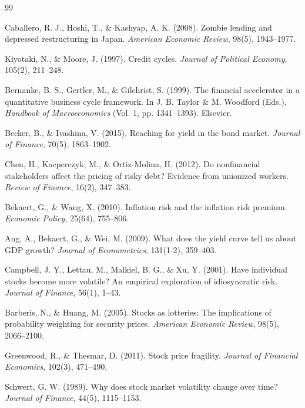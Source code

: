\documentclass[10pt,a4paper]{article}
\begin{document}
\begin{thebibliography}{99}
\footnotesize
\setlength{\itemsep}{0pt}

Caballero, R. J., Hoshi, T., \& Kashyap, A. K. (2008). Zombie lending and depressed restructuring in Japan. \textit{American Economic Review}, 98(5), 1943--1977.

Kiyotaki, N., \& Moore, J. (1997). Credit cycles. \textit{Journal of Political Economy}, 105(2), 211--248.

Bernanke, B. S., Gertler, M., \& Gilchrist, S. (1999). The financial accelerator in a quantitative business cycle framework. In J. B. Taylor \& M. Woodford (Eds.), \textit{Handbook of Macroeconomics} (Vol. 1, pp. 1341--1393). Elsevier.

Becker, B., \& Ivashina, V. (2015). Reaching for yield in the bond market. \textit{Journal of Finance}, 70(5), 1863--1902.

Chen, H., Kacperczyk, M., \& Ortiz-Molina, H. (2012). Do nonfinancial stakeholders affect the pricing of risky debt? Evidence from unionized workers. \textit{Review of Finance}, 16(2), 347--383.

Bekaert, G., \& Wang, X. (2010). Inflation risk and the inflation risk premium. \textit{Economic Policy}, 25(64), 755--806.

Ang, A., Bekaert, G., \& Wei, M. (2009). What does the yield curve tell us about GDP growth? \textit{Journal of Econometrics}, 131(1-2), 359--403.

Campbell, J. Y., Lettau, M., Malkiel, B. G., \& Xu, Y. (2001). Have individual stocks become more volatile? An empirical exploration of idiosyncratic risk. \textit{Journal of Finance}, 56(1), 1--43.

Barberis, N., \& Huang, M. (2005). Stocks as lotteries: The implications of probability weighting for security prices. \textit{American Economic Review}, 98(5), 2066--2100.

Greenwood, R., \& Thesmar, D. (2011). Stock price fragility. \textit{Journal of Financial Economics}, 102(3), 471--490.

Schwert, G. W. (1989). Why does stock market volatility change over time? \textit{Journal of Finance}, 44(5), 1115--1153.


\end{thebibliography}
\end{document}
